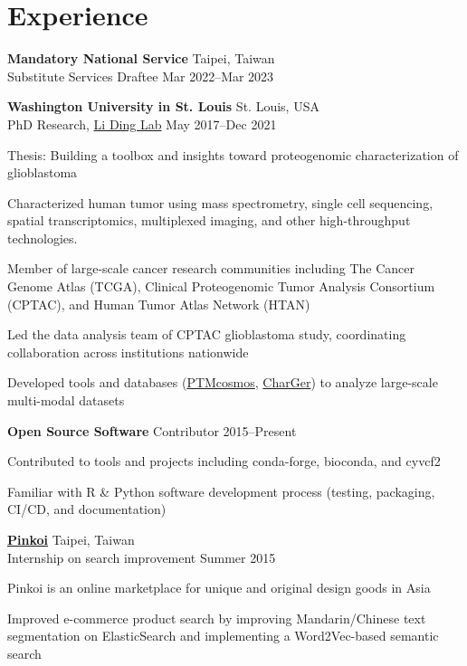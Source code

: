 \section{Experience}

\begin{entrylist}

\item \textbf{Mandatory National Service} \hfill Taipei, Taiwan\\
Substitute Services Draftee \hfill
Mar 2022--Mar 2023

\item \textbf{Washington University in St. Louis} \hfill St. Louis, USA\\
PhD Research, \href{https://dinglab.wustl.edu/}{Li Ding Lab} \hfill
May 2017--Dec 2021
\begin{detaillist}
    \item Thesis: Building a toolbox and insights toward proteogenomic characterization of glioblastoma
    \item Characterized human tumor using mass spectrometry, single cell sequencing, spatial transcriptomics, multiplexed imaging, and other high-throughput technologies.
    \item Member of large-scale cancer research communities including The Cancer Genome Atlas (TCGA), Clinical Proteogenomic Tumor Analysis Consortium (CPTAC), and Human Tumor Atlas Network (HTAN)
    \item Led the data analysis team of CPTAC glioblastoma study, coordinating collaboration across institutions nationwide
    \item Developed tools and databases (\href{https://ptmcosmos.wustl.edu/}{PTMcosmos}, \href{https://github.com/ding-lab/CharGer}{CharGer}) to analyze large-scale multi-modal datasets
\end{detaillist}

\item \textbf{Open Source Software}
Contributor \hfill 2015--Present
\begin{detaillist}
    \item Contributed to tools and projects including conda-forge, bioconda, and cyvcf2
    \item Familiar with R \& Python software development process (testing, packaging, CI/CD, and documentation)
\end{detaillist}

\item \href{http://pinkoi.com}{\textbf{Pinkoi}} \hfill Taipei, Taiwan\\
Internship on search improvement \hfill
Summer 2015
\begin{detaillist}
    \item Pinkoi is an online marketplace for unique and original design goods in Asia
    \item Improved e-commerce product search by improving Mandarin/Chinese text segmentation on ElasticSearch and implementing a Word2Vec-based semantic search
\end{detaillist}


\end{entrylist}
